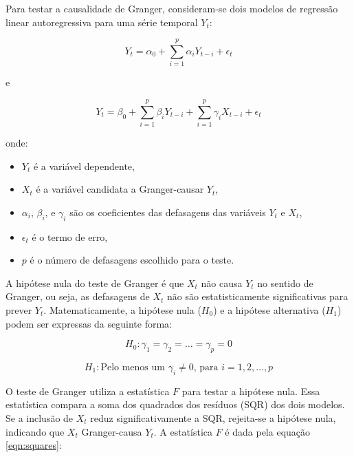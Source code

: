 \documentclass[12pt,oneside,a4paper,chapter=TITLE,english,brazil,sumario=abnt-6027-2012]{abntex2}
\begin{document}
Para testar a causalidade de Granger, consideram-se dois modelos de regressão linear autoregressiva para uma série temporal \( Y_t \):

\begin{equation}
	Y_t = \alpha_0 + \sum_{i=1}^{p} \alpha_i Y_{t-i} + \epsilon_t
\end{equation}

e

\begin{equation}
	Y_t = \beta_0 + \sum_{i=1}^{p} \beta_i Y_{t-i} + \sum_{i=1}^{p} \gamma_i X_{t-i} + \epsilon_t
\end{equation}

onde:

\begin{itemize}
	\item \( Y_t \) é a variável dependente,
	\item \( X_t \) é a variável candidata a Granger-causar \( Y_t \),
	\item \( \alpha_i \), \( \beta_i \), e \( \gamma_i \) são os coeficientes das defasagens das variáveis \( Y_t \) e \( X_t \),
	\item \( \epsilon_t \) é o termo de erro,
	\item \( p \) é o número de defasagens escolhido para o teste.
\end{itemize}

A hipótese nula do teste de Granger é que \( X_t \) não causa \( Y_t \) no sentido de Granger, ou seja, as defasagens de \( X_t \) não são estatisticamente significativas para prever \( Y_t \). Matematicamente, a hipótese nula (\( H_0 \)) e a hipótese alternativa (\( H_1 \)) podem ser expressas da seguinte forma:

\begin{equation}
	H_0: \gamma_1 = \gamma_2 = \dots = \gamma_p = 0
\end{equation}

\begin{equation}
	H_1: \text{Pelo menos um } \gamma_i \neq 0 \text{, para } i = 1, 2, \dots, p
\end{equation}

O teste de Granger utiliza a estatística \( F \) para testar a hipótese nula. Essa estatística compara a soma dos quadrados dos resíduos (SQR) dos dois modelos. Se a inclusão de \( X_t \) reduz significativamente a SQR, rejeita-se a hipótese nula, indicando que \( X_t \) Granger-causa \( Y_t \). A estatística \( F \) é dada pela equação \ref{eqn:squares}:
\end{document}
